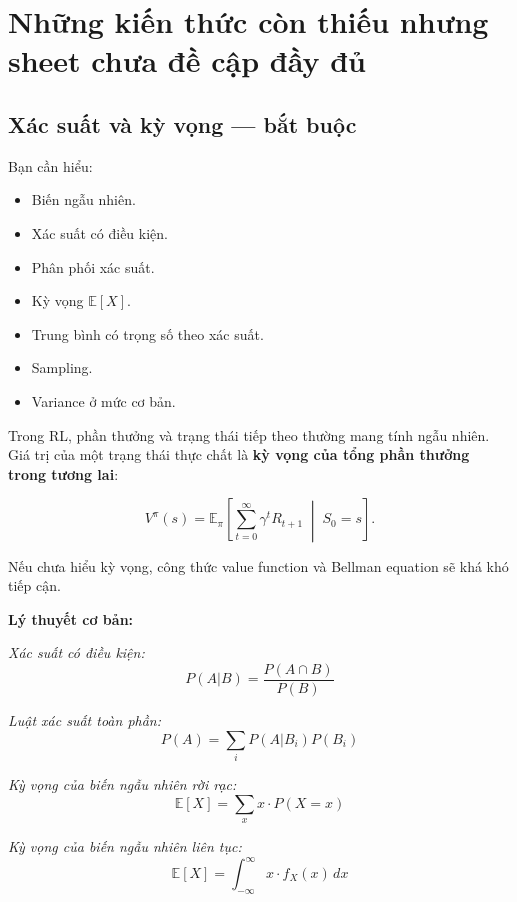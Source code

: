 \documentclass[12pt,a4paper]{article}
\begin{document}
\section{Những kiến thức còn thiếu nhưng sheet chưa đề cập đầy đủ}

\subsection{Xác suất và kỳ vọng --- bắt buộc}

Bạn cần hiểu:

\begin{itemize}[leftmargin=1.5em]
    \item Biến ngẫu nhiên.
    \item Xác suất có điều kiện.
    \item Phân phối xác suất.
    \item Kỳ vọng $\mathbb{E}[X]$.
    \item Trung bình có trọng số theo xác suất.
    \item Sampling.
    \item Variance ở mức cơ bản.
\end{itemize}

Trong RL, phần thưởng và trạng thái tiếp theo thường mang tính ngẫu nhiên. Giá trị của một trạng thái thực chất là \textbf{kỳ vọng của tổng phần thưởng trong tương lai}:

\begin{equation}
V^\pi(s)
=
\mathbb{E}_{\pi}
\left[
\sum_{t=0}^{\infty}
\gamma^t R_{t+1}
\;\middle|\;
S_0=s
\right].
\end{equation}

Nếu chưa hiểu kỳ vọng, công thức value function và Bellman equation sẽ khá khó tiếp cận.

\textbf{Lý thuyết cơ bản:}

\textit{Xác suất có điều kiện:}
\begin{equation}
P(A|B) = \frac{P(A \cap B)}{P(B)}
\end{equation}

\textit{Luật xác suất toàn phần:}
\begin{equation}
P(A) = \sum_{i} P(A|B_i) P(B_i)
\end{equation}

\textit{Kỳ vọng của biến ngẫu nhiên rời rạc:}
\begin{equation}
\mathbb{E}[X] = \sum_{x} x \cdot P(X=x)
\end{equation}

\textit{Kỳ vọng của biến ngẫu nhiên liên tục:}
\begin{equation}
\mathbb{E}[X] = \int_{-\infty}^{\infty} x \cdot f_X(x) \, dx
\end{equation}
\end{document}

